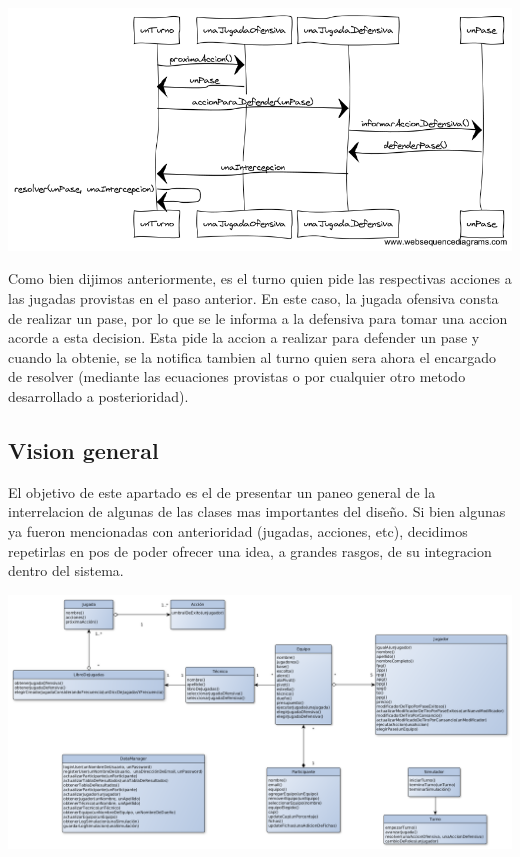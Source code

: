 \begin{center}
\includegraphics[scale=0.4]{diagramas/secuencia-turnos-1.png}
\end{center}
Como bien dijimos anteriormente, es el turno quien pide las respectivas acciones a las jugadas provistas en el paso anterior. En este caso, la jugada ofensiva consta de realizar un pase, por lo que se le informa a la defensiva para tomar una accion acorde a esta decision. Esta pide la accion a realizar para defender un pase y cuando la obtenie, se la notifica tambien al turno quien sera ahora el encargado de resolver (mediante las ecuaciones provistas o por cualquier otro metodo desarrollado a posterioridad).

\subsection{Vision general}
El objetivo de este apartado es el de presentar un paneo general de la interrelacion de algunas de las clases mas importantes del diseño. Si bien algunas ya fueron mencionadas con anterioridad (jugadas, acciones, etc), decidimos repetirlas en pos de poder ofrecer una idea, a grandes rasgos, de su integracion dentro del sistema.

\begin{center}
\includegraphics[scale=0.3]{diagramas/varias_clases.png}
\end{center}